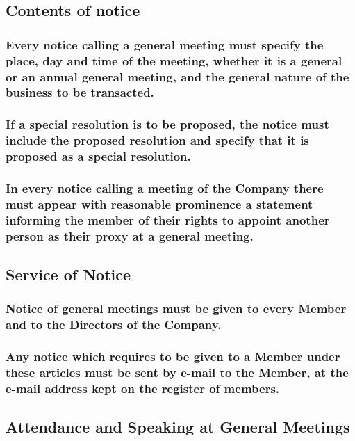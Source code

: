 \documentclass[12pt]{article}
\begin{document}
\subsection[Contents of Notice of General Meetings]{Contents of notice}
\subsubsection[Notices Must Include Details]{Every notice calling a general meeting must specify the place, day and time of the meeting, whether it is a general or an annual general meeting, and the general nature of the business to be transacted.}
\subsubsection[Notices Must Include Any Special Resolution]{If a special resolution is to be proposed, the notice must include the proposed resolution and specify that it is proposed as a special resolution.}
\subsubsection[Notices of General Meetings Must State Proxies May Be Appointed]{In every notice calling a meeting of the Company there must appear with reasonable prominence a statement informing the member of their rights to appoint another person as their proxy at a general meeting.}

\subsection{Service of Notice}
\subsubsection[Notices Must Be Communicated to All Members]{Notice of general meetings must be given to every Member and to the Directors of the Company.}
\subsubsection[Notices Must Be Sent by E-mail]{Any notice which requires to be given to a Member under these articles must be sent by e-mail to the Member, at the e-mail address kept on the register of members.}

\subsection{Attendance and Speaking at General Meetings}
\end{document}
